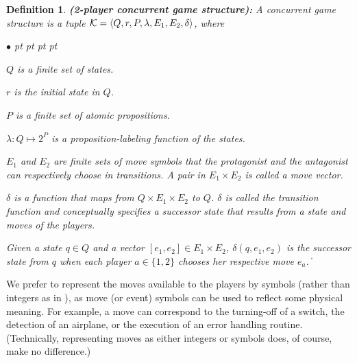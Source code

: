 \documentclass[times,10pt,twocolumn]{article}
\newtheorem{definition}{Definition}
\newcommand\qed{\hfill\ensuremath{\Box}}
\newcommand{\calk}{{\cal K}}
\def\qed{\ifmmode\|\else{\unskip\nobreak\hfil
\penalty50\hskip1em\null\nobreak\hfil$\blacksquare$
\parfillskip=0pt\finalhyphendemerits=0\endgraf}\fi}
\newenvironment{list1}{\begin{list}{$\bullet$}
{\topsep 0 pt \parsep 0 pt \partopsep 0 pt \itemsep 0
pt}}{\end{list}}
\begin{document}
\begin{definition} \label{def.cncgame} 
{\bf (2-player concurrent game structure):}
A {\em concurrent} game structure is a tuple 
$\calk=\langle Q,r,P,\lambda,E_1,E_2,\delta\rangle$, where
\begin{list1}
\item $Q$ is a finite set of states. 
\item $r$ is the initial state in $Q$.  
\item $P$ is a finite set of atomic propositions. 
\item $\lambda:Q\mapsto 2^P$ is a proposition-labeling function of the states. 
\item $E_1$ and $E_2$ are finite sets of move symbols that the protagonist and 
the antagonist can respectively choose in transitions.  
A pair in $E_1\times E_2$ is called a {\em move vector}.  
\item $\delta$ is a function that maps 
  from $Q\times E_1\times E_2$ to $Q$.  
  $\delta$ is called the transition function and 
  conceptually specifies a successor state 
  that results from a state and moves of the players. 
\label{reply1.for.convenience.succ} 
\end{list1}
Given a state $q\in Q$ and a vector $[e_1,e_2]\in E_1\times E_2$, 
$\delta(q,e_1,e_2)$ is the successor state from 
$q$ when each player $a\in \{1,2\}$ chooses her respective move $e_a$.  
\qed 
\end{definition} 

We prefer to represent the moves available to the players by symbols (rather than integers as in \cite{AHK02}), as move (or event) symbols can be used to reflect some physical meaning.  
For example, a move can correspond to the turning-off of a switch,  
the detection of an airplane, 
or\label{reply1.grammar.or} the execution of an error handling routine.  
(Technically, representing moves as either integers or symbols 
does, of course, make no difference.)



\end{document}
